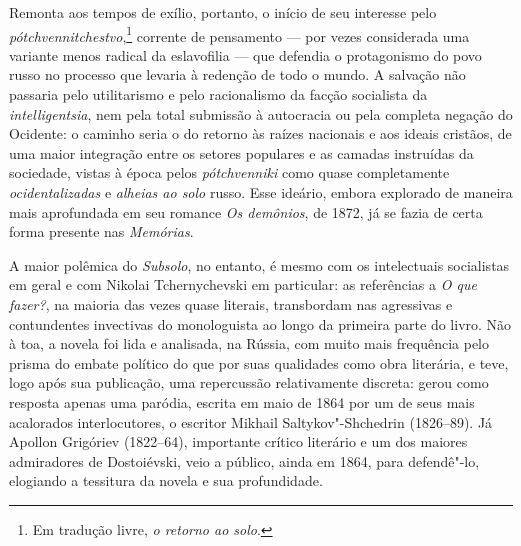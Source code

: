 Remonta aos tempos de exílio, portanto, o início de seu interesse pelo
\textit{pótchvennitchestvo},\footnote{Em tradução livre, \textit{o retorno ao solo}.}
corrente de pensamento --- por vezes considerada uma variante menos radical da
eslavofilia --- que defendia o protagonismo do povo russo no processo que levaria
à redenção de todo o mundo. A salvação não passaria pelo utilitarismo e pelo
racionalismo da facção socialista da \textit{intelligentsia}, nem pela total
submissão à autocracia ou pela completa negação do Ocidente: o caminho seria o
do retorno às raízes nacionais e aos ideais cristãos, de uma maior integração
entre os setores populares e as camadas instruídas da sociedade, vistas à época
pelos \textit{pótchvenniki} como quase completamente \textit{ocidentalizadas} e
\textit{alheias ao solo} russo. Esse ideário, embora explorado de maneira mais
aprofundada em seu romance \textit{Os demônios}, de 1872, já se fazia de certa
forma presente nas \textit{Memórias}.

A maior polêmica do \textit{Subsolo}, no entanto, é mesmo com os intelectuais
socialistas em geral e com Nikolai Tchernychevski em particular: as referências
a \textit{O que fazer?}, na maioria das vezes quase literais, transbordam nas
agressivas e contundentes invectivas do monologuista ao longo da primeira parte
do livro. Não à toa, a novela foi lida e analisada, na Rússia, com muito mais
frequência pelo prisma do embate político do que por suas qualidades como obra
literária, e teve, logo após sua publicação, uma repercussão relativamente
discreta: gerou como resposta apenas uma paródia, escrita em maio de 1864 por
um de seus mais acalorados interlocutores, o escritor Mikhail Saltykov"-Shchedrin
(1826--89). Já Apollon Grigóriev (1822--64), importante crítico literário e um
dos maiores admiradores de Dostoiévski, veio a público, ainda em 1864, para
defendê"-lo, elogiando a tessitura da novela e sua profundidade.

